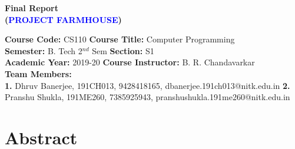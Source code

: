 \documentclass[12pt]{article}
\begin{document}




\begin{center}
    \textbf{\Large{Final Report \\
    (\textcolor{blue}{PROJECT FARMHOUSE})}}
\end{center}

\noindent 
\textbf{Course Code:} CS110 
\hspace{2in} 
\textbf{Course Title:} Computer Programming \\
\textbf{Semester:} B. Tech 2$^{nd}$ Sem 
\hspace{1.6in} 
\textbf{Section:} S1 \\
\textbf{Academic Year:} 2019-20 
\hspace{1.8in} 
\textbf{Course Instructor:} B. R. Chandavarkar \\
\textbf{Team Members:} \\
\textbf{1.} Dhruv Banerjee, 191CH013, 9428418165, dbanerjee.191ch013@nitk.edu.in
\newline
\textbf{2.} Pranshu Shukla, 191ME260, 7385925943, pranshushukla.191me260@nitk.edu.in

\vspace{0.25in}

\section{Abstract}
\end{document}
